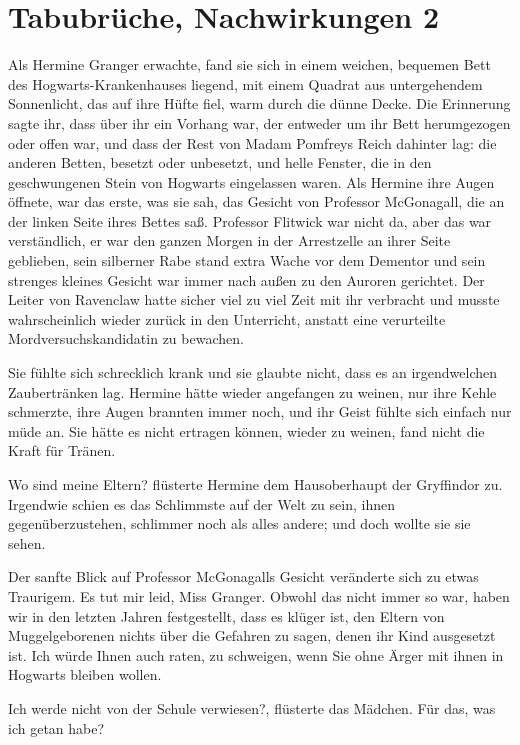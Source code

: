 \chapter{Tabubrüche, Nachwirkungen 2}

Als Hermine Granger erwachte, fand sie sich in einem weichen, bequemen Bett des
Hogwarts-Krankenhauses liegend, mit einem Quadrat aus untergehendem Sonnenlicht,
das auf ihre Hüfte fiel, warm durch die dünne Decke. Die Erinnerung sagte ihr,
dass über ihr ein Vorhang war, der entweder um ihr Bett herumgezogen oder offen
war, und dass der Rest von Madam Pomfreys Reich dahinter lag: die anderen
Betten, besetzt oder unbesetzt, und helle Fenster, die in den geschwungenen
Stein von Hogwarts eingelassen waren. Als Hermine ihre Augen öffnete, war das
erste, was sie sah, das Gesicht von Professor McGonagall, die an der linken
Seite ihres Bettes saß. Professor Flitwick war nicht da, aber das war
verständlich, er war den ganzen Morgen in der Arrestzelle an ihrer Seite
geblieben, sein silberner Rabe stand extra Wache vor dem Dementor und sein
strenges kleines Gesicht war immer nach außen zu den Auroren gerichtet. Der
Leiter von Ravenclaw hatte sicher viel zu viel Zeit mit ihr verbracht und musste
wahrscheinlich wieder zurück in den Unterricht, anstatt eine verurteilte
Mordversuchskandidatin zu bewachen.

Sie fühlte sich schrecklich krank und sie glaubte nicht, dass es an
irgendwelchen Zaubertränken lag. Hermine hätte wieder angefangen zu weinen, nur
ihre Kehle schmerzte, ihre Augen brannten immer noch, und ihr Geist fühlte sich
einfach nur müde an. Sie hätte es nicht ertragen können, wieder zu weinen, fand
nicht die Kraft für Tränen.

\glqq{}Wo sind meine Eltern?\grqq{} flüsterte Hermine dem Hausoberhaupt der
Gryffindor zu. Irgendwie schien es das Schlimmste auf der Welt zu sein, ihnen
gegenüberzustehen, schlimmer noch als alles andere; und doch wollte sie sie
sehen.

Der sanfte Blick auf Professor McGonagalls Gesicht veränderte sich zu etwas
Traurigem. \glqq{}Es tut mir leid, Miss Granger. Obwohl das nicht immer so war,
haben wir in den letzten Jahren festgestellt, dass es klüger ist, den Eltern von
Muggelgeborenen nichts über die Gefahren zu sagen, denen ihr Kind ausgesetzt
ist. Ich würde Ihnen auch raten, zu schweigen, wenn Sie ohne Ärger mit ihnen in
Hogwarts bleiben wollen.\grqq{}

\glqq{}Ich werde nicht von der Schule verwiesen?\grqq{}, flüsterte das Mädchen.
\glqq{}Für das, was ich getan habe?\grqq{}

